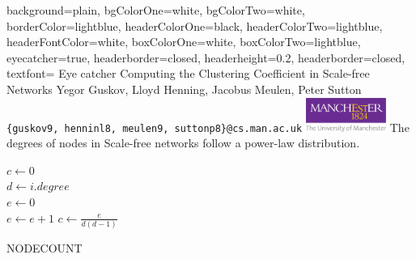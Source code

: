 \documentclass[landscape,a1paper, fontscale=0.285]{baposter}
\begin{document}
\begin{poster}
    {
        background=plain,
        bgColorOne=white,
        bgColorTwo=white,
        borderColor=lightblue,
        headerColorOne=black,
        headerColorTwo=lightblue,
        headerFontColor=white,
        boxColorOne=white,
        boxColorTwo=lightblue,
        eyecatcher=true,
        headerborder=closed,
        headerheight=0.2\textheight,
      headerborder=closed,
      textfont={\setlength{\parindent}{1.5em}}
    }
{
    Eye catcher
}
{
    \LARGE Computing the Clustering Coefficient in Scale-free Networks
}
{
    Yegor Guskov, Lloyd Henning, Jacobus Meulen, Peter Sutton\\
    {\small\tt\{guskov9, henninl8, meulen9, suttonp8\}@cs.man.ac.uk}
}
{
    \includegraphics[height=3.0em]{images/logo}
}
{
    The degrees of nodes in Scale-free networks follow a power-law distribution.
}
{
    \begin{algorithm}[H]
        $c \gets 0$\\
        {
            $d \gets i.degree$\\
            $e \gets 0$\\
            {
                {
                    {
                        $e \gets e + 1$
                    }
                }
            }
            $c \gets \frac{e}{d\left(d-1\right)}$
        }
        \caption{NODECOUNT}
    \end{algorithm}
}
{
    \begin{algorithm}[H]

\end{algorithm}}
\end{poster}
\end{document}
